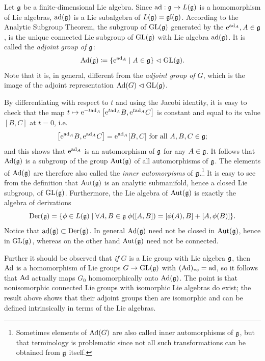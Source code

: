 \begin{example}\label{ex adjoint group}
    Let $\mathfrak{g}$ be a finite-dimensional Lie algebra. Since $\mathrm{ad}:\mathfrak{g}\to \boldsymbol{\mathrm{\mathrm}}{L}(\mathfrak{g})$ is a homomorphism of Lie algebras, $\mathrm{ad}(\mathfrak{g})$ is a Lie subalgebra of $\boldsymbol{\mathrm{\mathrm}}{L}(\mathfrak{g})=\mathfrak{gl}(\mathfrak{g})$. According to the Analytic Subgroup Theorem, the subgroup of $\operatorname{GL}(\mathfrak{g})$ generated by the $\mathrm{e}^{\mathrm{ad}_A}, A\in\mathfrak{g}$, is the unique connected Lie subgroup of $\operatorname{GL}(\mathfrak{g})$ with Lie algebra $\mathrm{ad}(\mathfrak{g})$. It is called the \emph{adjoint group of $\mathfrak{g}$}:
    \[\mathrm{Ad}(\mathfrak{g})\coloneqq \{\mathrm{e}^{\mathrm{ad}_A}\mid A\in\mathfrak{g}\}\vartriangleleft \operatorname{GL}(\mathfrak{g}).\]
    Note that it is, in general, different from the \emph{adjoint group of $G$}, which is the image of the adjoint representation $\mathrm{Ad} (G)\vartriangleleft \operatorname{GL}(\mathfrak{g})$.
    
    By differentiating with respect to $t$ and using the Jacobi identity, it is easy to check that the map $t\mapsto \mathrm{e}^{-t\mathrm{ad}_A}\left[\mathrm{e}^{t\mathrm{ad}_A}B,\mathrm{e}^{t\mathrm{ad}_A}C\right]$ is constant and equal to its value $[B,C]$ at $t=0$, i.e.
    \[\left[\mathrm{e}^{\mathrm{ad}_A}B,\mathrm{e}^{\mathrm{ad}_A}C\right]=\mathrm{e}^{\mathrm{ad}_A}[B,C] \text{ for all }A,B,C\in\mathfrak{g};\]
    and this shows that $\mathrm{e}^{\mathrm{ad}_A}$ is an automorphism of $\mathfrak{g}$ for any $A\in\mathfrak{g}$. It follows that $\mathrm{Ad}(\mathfrak{g})$ is a subgroup of the group $\operatorname{Aut}(\mathfrak{g})$ of all automorphisms of $\mathfrak{g}$. The elements of $\mathrm{Ad}(\mathfrak{g})$ are therefore also called the \emph{inner automorpisms} of $\mathfrak{g}$.\footnote{Sometimes elements of $\mathrm{Ad}(G)$ are also called inner automorphisms of $\mathfrak{g}$, but that terminology is problematic since not all such transformations can be obtained from $\mathfrak{g}$ itself.} It is easy to see from the definition that $\operatorname{Aut}(\mathfrak{g})$ is an analytic submanifold, hence a closed Lie subgroup, of $\operatorname{GL}(\mathfrak{g})$. Furthermore, the Lie algebra of $\operatorname{Aut}(\mathfrak{g})$ is exactly the algebra of derivations
    \[\operatorname{Der}(\mathfrak{g})=\{\phi\in \boldsymbol{\mathrm{\mathrm}}{L}(\mathfrak{g})\mid \forall A,B\in\mathfrak{g}\;\phi ([A,B])=[\phi(A),B]+[A,\phi(B)]\}.\]
    Notice that $\mathrm{ad}(\mathfrak{g})\subset \operatorname{Der}(\mathfrak{g})$. In general $\mathrm{Ad}(\mathfrak{g})$ need not be closed in $\operatorname{Aut}(\mathfrak{g})$, hence in $\operatorname{GL}(\mathfrak{g})$, whereas on the other hand $\operatorname{Aut}(\mathfrak{g})$ need not be connected.

    Further it should be observed that \emph{if} $G$ is a Lie group with Lie algebra $\mathfrak{g}$, then $\mathrm{Ad}$ is a homomorphism of Lie groups $G\to\operatorname{GL}(\mathfrak{g})$ with $(\mathrm{Ad})_{\ast e}=\mathrm{ad}$, so it follows that $\mathrm{Ad}$ actually maps $G_0$ homomorphically onto $\mathrm{Ad}(\mathfrak{g})$. The point is that nonisomorphic connected Lie groups with isomorphic Lie algebras do exist; the result above shows that their adjoint groups then are isomorphic and can be defined intrinsically in terms of the Lie algebras.


\end{example}
